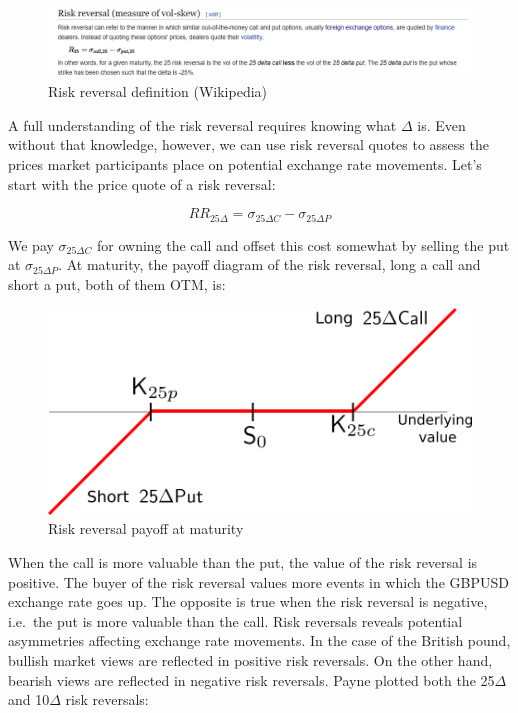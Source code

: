 \documentclass[]{book}
\theoremstyle{definition}
\theoremstyle{definition}
\theoremstyle{definition}
\theoremstyle{remark}
\begin{document}
\begin{figure}
\includegraphics[width=1\linewidth]{images/figRRDefinition} \caption{Risk reversal definition (Wikipedia)}\label{fig:unnamed-chunk-14}
\end{figure}

A full understanding of the risk reversal requires knowing what
\(\Delta\) is. Even without that knowledge, however, we can use risk
reversal quotes to assess the prices market participants place on
potential exchange rate movements. Let's start with the price quote of a
risk reversal:

\[
RR_{25\Delta} = \sigma_{25\Delta C} - \sigma_{25\Delta P}
\]

We pay \(\sigma_{25\Delta C}\) for owning the call and offset this cost
somewhat by selling the put at \(\sigma_{25\Delta P}\). At maturity, the
payoff diagram of the risk reversal, long a call and short a put, both
of them OTM, is:

\begin{figure}
\includegraphics[width=0.7\linewidth]{images/fig25RRSimple} \caption{Risk reversal payoff at maturity}\label{fig:unnamed-chunk-15}
\end{figure}

When the call is more valuable than the put, the value of the risk
reversal is positive. The buyer of the risk reversal values more events
in which the GBPUSD exchange rate goes up. The opposite is true when the
risk reversal is negative, i.e.~the put is more valuable than the call.
Risk reversals reveals potential asymmetries affecting exchange rate
movements. In the case of the British pound, bullish market views are
reflected in positive risk reversals. On the other hand, bearish views
are reflected in negative risk reversals. Payne plotted both the
25\(\Delta\) and 10\(\Delta\) risk reversals:
\end{document}
